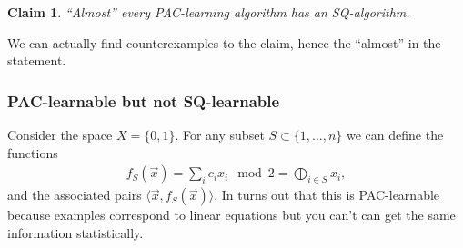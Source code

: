 \documentclass[12pt, letterpaper]{article}
\numberwithin{equation}{section} %
\newtheorem{claim}[theorem]{Claim}
\theoremstyle{definition}
\theoremstyle{remark}
\begin{document}
\begin{claim}
``Almost'' every PAC-learning algorithm has an SQ-algorithm.
\end{claim}

We can actually find counterexamples to the claim, hence the ``almost'' in the statement.
\subsubsection{PAC-learnable but not SQ-learnable}
Consider the space $X=\lbrace 0,1 \rbrace$. For any subset $S\subset \lbrace 1,\ldots, n\rbrace$ we can define the functions
\begin{align}
f_S(\vec x) = \sum_ic_ix_i \mod 2 = \bigoplus\limits_{i\in S} x_i,
\end{align}
and the associated pairs $\langle \vec x, f_S(\vec x)\rangle$. In turns out that this is PAC-learnable because examples correspond to linear equations but you can't can get the same information statistically.
\end{document}
